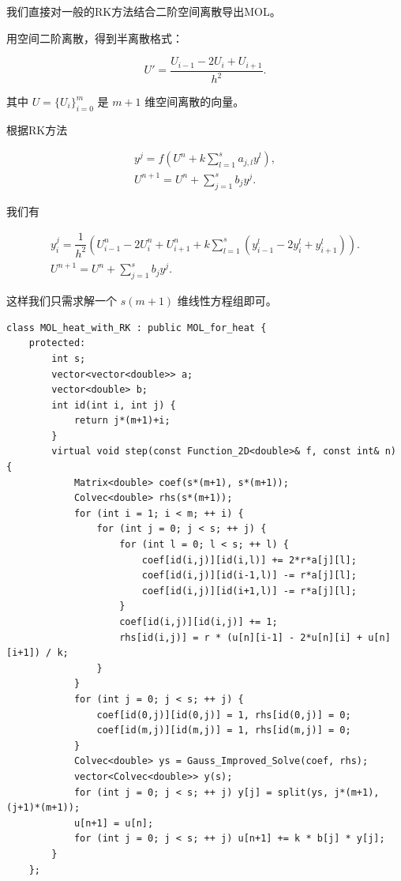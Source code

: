\documentclass{ctexart}
\begin{document}
我们直接对一般的RK方法结合二阶空间离散导出MOL。

用空间二阶离散，得到半离散格式：

\begin{equation}
	U' = \dfrac {U_{i-1} - 2U_i + U_{i+1}}{h^2}.
\end{equation}

其中 $U=\{U_i\}_{i=0}^m$ 是 $m+1$ 维空间离散的向量。

根据RK方法

\begin{equation}	
\begin{aligned}
	y^j = f(U^n + k\sum_{l=1}^s a_{j,l}y^l),\\
	U^{n+1} = U^n + \sum_{j=1}^s b_jy^j.
\end{aligned}
\end{equation}

我们有

\begin{equation}
\begin{aligned}
	y_i^j = \dfrac 1{h^2}(U^n_{i-1} - 2U^n_i + U^n_{i+1} + k\sum_{l=1}^s (y^l_{i-1} - 2y^l_i + y^l_{i+1})).\\
	U^{n+1} = U^n + \sum_{j=1}^s b_jy^j.
\end{aligned}
\end{equation}

这样我们只需求解一个 $s(m+1)$ 维线性方程组即可。

\begin{lstlisting}
class MOL_heat_with_RK : public MOL_for_heat {
	protected:
		int s;
		vector<vector<double>> a;
		vector<double> b;
		int id(int i, int j) {
			return j*(m+1)+i;
		}
		virtual void step(const Function_2D<double>& f, const int& n) {
			Matrix<double> coef(s*(m+1), s*(m+1));
			Colvec<double> rhs(s*(m+1));
			for (int i = 1; i < m; ++ i) {
				for (int j = 0; j < s; ++ j) {
					for (int l = 0; l < s; ++ l) {
						coef[id(i,j)][id(i,l)] += 2*r*a[j][l];
						coef[id(i,j)][id(i-1,l)] -= r*a[j][l];
						coef[id(i,j)][id(i+1,l)] -= r*a[j][l];
					}
					coef[id(i,j)][id(i,j)] += 1;
					rhs[id(i,j)] = r * (u[n][i-1] - 2*u[n][i] + u[n][i+1]) / k;
				}
			}
			for (int j = 0; j < s; ++ j) {
				coef[id(0,j)][id(0,j)] = 1, rhs[id(0,j)] = 0;
				coef[id(m,j)][id(m,j)] = 1, rhs[id(m,j)] = 0;
			}
			Colvec<double> ys = Gauss_Improved_Solve(coef, rhs);
			vector<Colvec<double>> y(s);
			for (int j = 0; j < s; ++ j) y[j] = split(ys, j*(m+1), (j+1)*(m+1));
			u[n+1] = u[n];
			for (int j = 0; j < s; ++ j) u[n+1] += k * b[j] * y[j];
		}
	};
\end{lstlisting}
\end{document}
